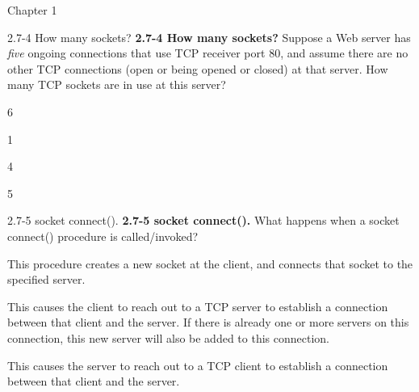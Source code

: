 \documentclass[a4paper]{article}
\begin{document}
\begin{quiz}{Chapter 1}
\begin{multi}[points=1,shuffle]{2.7-4 How many sockets?}
\textbf{2.7-4 How many sockets?} Suppose a Web server has \emph{five} ongoing connections that use TCP receiver port 80, and assume there are no other TCP connections (open or being opened or closed) at that server.  How many TCP sockets are in use at this server?
\item* 6
\item 1
\item 4
\item 5
\end{multi}

\begin{multi}[points=1,shuffle]{2.7-5 socket connect().}
\textbf{2.7-5 socket connect().} What happens when a socket connect() procedure is called/invoked?
\item* This procedure creates a new socket at the client, and connects that socket to the specified server.
\item This causes the client to reach out to a TCP server to establish a connection between that client and the server. If there is already one or more servers on this connection, this new server will also be added to this connection.
\item This causes the server to reach out to a TCP client to establish a connection between that client and the server.
\end{multi}

\end{quiz}
\end{document}
